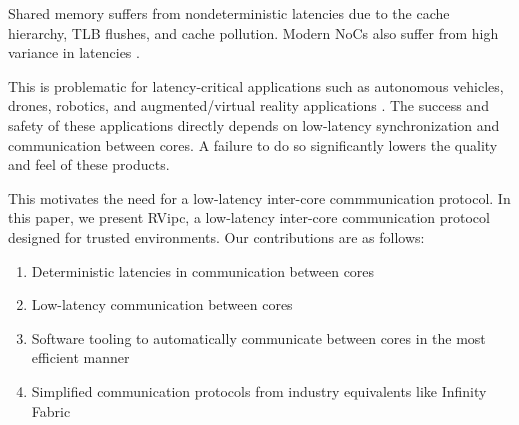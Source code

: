   Shared memory suffers from nondeterministic latencies due to the cache hierarchy, TLB flushes, and cache pollution. Modern NoCs also suffer from high variance in latencies \cite{LowLatencyVarianceNoCRouter}.

  This is problematic for latency-critical applications such as autonomous vehicles, drones, robotics, and augmented/virtual reality applications \cite{Elbamby:VR:2018}. The success and safety of these applications directly depends on low-latency synchronization and communication between cores. A failure to do so significantly lowers the quality and feel of these products. 

  This motivates the need for a low-latency inter-core commmunication protocol. In this paper, we present RVipc, a low-latency inter-core communication protocol designed for trusted environments. Our contributions are as follows:

  \begin{enumerate}
    \item Deterministic latencies in communication between cores
    \item Low-latency communication between cores 
    \item Software tooling to automatically communicate between cores in the most efficient manner
    \item Simplified communication protocols from industry equivalents like Infinity Fabric \cite{AMD:CDNA3:WhitePaper}
  \end{enumerate}
